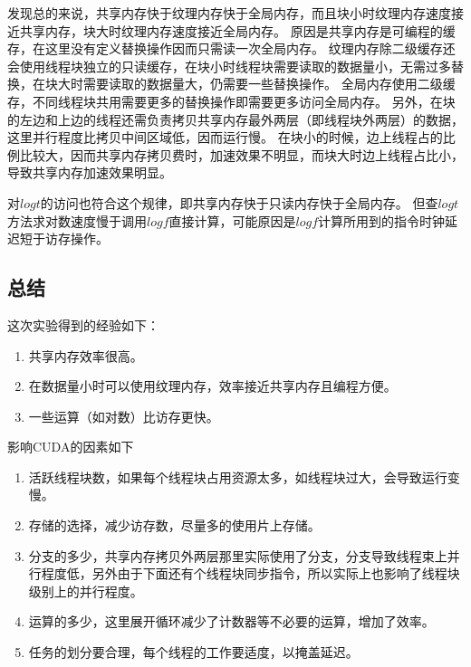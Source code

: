 \documentclass[UTF8, a4paper, 11pt]{article}
\begin{document}
发现总的来说，共享内存快于纹理内存快于全局内存，而且块小时纹理内存速度接近共享内存，块大时纹理内存速度接近全局内存。
原因是共享内存是可编程的缓存，在这里没有定义替换操作因而只需读一次全局内存。
纹理内存除二级缓存还会使用线程块独立的只读缓存，在块小时线程块需要读取的数据量小，无需过多替换，在块大时需要读取的数据量大，仍需要一些替换操作。
全局内存使用二级缓存，不同线程块共用需要更多的替换操作即需要更多访问全局内存。
另外，在块的左边和上边的线程还需负责拷贝共享内存最外两层（即线程块外两层）的数据，这里并行程度比拷贝中间区域低，因而运行慢。
在块小的时候，边上线程占的比例比较大，因而共享内存拷贝费时，加速效果不明显，而块大时边上线程占比小，导致共享内存加速效果明显。

对$logt$的访问也符合这个规律，即共享内存快于只读内存快于全局内存。
但查$logt$方法求对数速度慢于调用$logf$直接计算，可能原因是$logf$计算所用到的指令时钟延迟短于访存操作。
\subsection{总结}
这次实验得到的经验如下：
\begin{enumerate}
\item 共享内存效率很高。
\item 在数据量小时可以使用纹理内存，效率接近共享内存且编程方便。
\item 一些运算（如对数）比访存更快。
\end{enumerate}
影响CUDA的因素如下
\begin{enumerate}
\item 活跃线程块数，如果每个线程块占用资源太多，如线程块过大，会导致运行变慢。
\item 存储的选择，减少访存数，尽量多的使用片上存储。
\item 分支的多少，共享内存拷贝外两层那里实际使用了分支，分支导致线程束上并行程度低，另外由于下面还有个线程块同步指令，所以实际上也影响了线程块级别上的并行程度。
\item 运算的多少，这里展开循环减少了计数器等不必要的运算，增加了效率。
\item 任务的划分要合理，每个线程的工作要适度，以掩盖延迟。
\end{enumerate}
\end{document}

